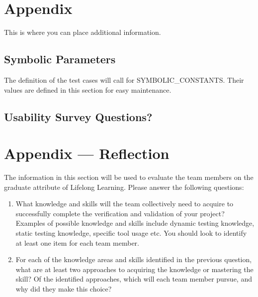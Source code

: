 \documentclass[12pt, titlepage]{article}
\begin{document}





\newpage

\section{Appendix}

This is where you can place additional information.

\subsection{Symbolic Parameters}

The definition of the test cases will call for SYMBOLIC\_CONSTANTS. Their values are defined in
this section for easy maintenance.

\subsection{Usability Survey Questions?}


\newpage{}
\section*{Appendix --- Reflection}

The information in this section will be used to evaluate the team members on the graduate attribute
of Lifelong Learning. Please answer the following questions:

\begin{enumerate}
	\item What knowledge and skills will the team collectively need to acquire to successfully complete the
	      verification and validation of your project? Examples of possible knowledge and skills include
	      dynamic testing knowledge, static testing knowledge, specific tool usage etc. You should look to
	      identify at least one item for each team member.
	\item For each of the knowledge areas and skills identified in the previous question, what are at least
	      two approaches to acquiring the knowledge or mastering the skill? Of the identified approaches,
	      which will each team member pursue, and why did they make this choice?
\end{enumerate}
\end{document}

